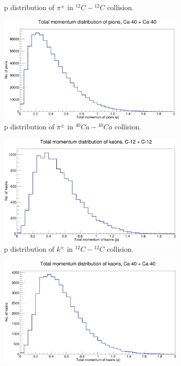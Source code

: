 \documentclass[12pt]{article}
\begin{document}
\begin{figure}[h]
\begin{subfigure}[h]{0.49\textwidth}
\caption{p distribution of $\pi^{\pm}$ in $^{12}C-{^{12}C}$ collision.}
\label{Generator - Total momentum distribution of pions C12.}
\end{subfigure}
\hfill
\vspace{1cm}
\begin{subfigure}[h]{0.49\textwidth}
\centering
\includegraphics[scale=0.14]{pToT_pions_Ca.png}
\caption{p distribution of $\pi^{\pm}$ in $^{40}Ca-{^{40}Ca}$ collision.}
\label{Generator - Total momentum distribution of pions Ca40.}
\end{subfigure}
\hfill
\begin{subfigure}[h]{0.49\textwidth}
\centering
\includegraphics[scale=0.14]{pToT_kaons_C12.png}
\caption{p distribution of $k^{\pm}$ in $^{12}C-{^{12}C}$ collision.}
\label{Generator - Total momentum distribution of kaons C12.}
\end{subfigure}
\hfill
\begin{subfigure}[h]{0.49\textwidth}
\centering
\includegraphics[scale=0.14]{pToT_kaons_Ca.png}

\end{subfigure}
\end{figure}
\end{document}
